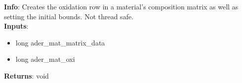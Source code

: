 \textbf{Info}: Creates the oxidation row in a material's composition matrix as
well as setting the initial bounds. Not thread safe. \\

\noindent \textbf{Inputs}:
\begin{itemize}
\item{long ader\_mat\_matrix\_data}
\item{long ader\_mat\_oxi}
\end{itemize}

\noindent \textbf{Returns}: void
